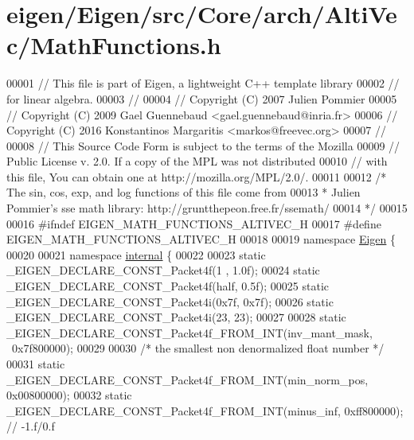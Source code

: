 \hypertarget{eigen_2_eigen_2src_2_core_2arch_2_alti_vec_2_math_functions_8h_source}{}\section{eigen/\+Eigen/src/\+Core/arch/\+Alti\+Vec/\+Math\+Functions.h}
\label{eigen_2_eigen_2src_2_core_2arch_2_alti_vec_2_math_functions_8h_source}

\begin{DoxyCode}
00001 \textcolor{comment}{// This file is part of Eigen, a lightweight C++ template library}
00002 \textcolor{comment}{// for linear algebra.}
00003 \textcolor{comment}{//}
00004 \textcolor{comment}{// Copyright (C) 2007 Julien Pommier}
00005 \textcolor{comment}{// Copyright (C) 2009 Gael Guennebaud <gael.guennebaud@inria.fr>}
00006 \textcolor{comment}{// Copyright (C) 2016 Konstantinos Margaritis <markos@freevec.org>}
00007 \textcolor{comment}{//}
00008 \textcolor{comment}{// This Source Code Form is subject to the terms of the Mozilla}
00009 \textcolor{comment}{// Public License v. 2.0. If a copy of the MPL was not distributed}
00010 \textcolor{comment}{// with this file, You can obtain one at http://mozilla.org/MPL/2.0/.}
00011 
00012 \textcolor{comment}{/* The sin, cos, exp, and log functions of this file come from}
00013 \textcolor{comment}{ * Julien Pommier's sse math library: http://gruntthepeon.free.fr/ssemath/}
00014 \textcolor{comment}{ */}
00015 
00016 \textcolor{preprocessor}{#ifndef EIGEN\_MATH\_FUNCTIONS\_ALTIVEC\_H}
00017 \textcolor{preprocessor}{#define EIGEN\_MATH\_FUNCTIONS\_ALTIVEC\_H}
00018 
00019 \textcolor{keyword}{namespace }\hyperlink{namespace_eigen}{Eigen} \{
00020 
00021 \textcolor{keyword}{namespace }\hyperlink{namespaceinternal}{internal} \{
00022 
00023 \textcolor{keyword}{static} \_EIGEN\_DECLARE\_CONST\_Packet4f(1 , 1.0f);
00024 \textcolor{keyword}{static} \_EIGEN\_DECLARE\_CONST\_Packet4f(half, 0.5f);
00025 \textcolor{keyword}{static} \_EIGEN\_DECLARE\_CONST\_Packet4i(0x7f, 0x7f);
00026 \textcolor{keyword}{static} \_EIGEN\_DECLARE\_CONST\_Packet4i(23, 23);
00027 
00028 \textcolor{keyword}{static} \_EIGEN\_DECLARE\_CONST\_Packet4f\_FROM\_INT(inv\_mant\_mask, ~0x7f800000);
00029 
00030 \textcolor{comment}{/* the smallest non denormalized float number */}
00031 \textcolor{keyword}{static} \_EIGEN\_DECLARE\_CONST\_Packet4f\_FROM\_INT(min\_norm\_pos,  0x00800000);
00032 \textcolor{keyword}{static} \_EIGEN\_DECLARE\_CONST\_Packet4f\_FROM\_INT(minus\_inf,     0xff800000); \textcolor{comment}{// -1.f/0.f}

\end{DoxyCode}
